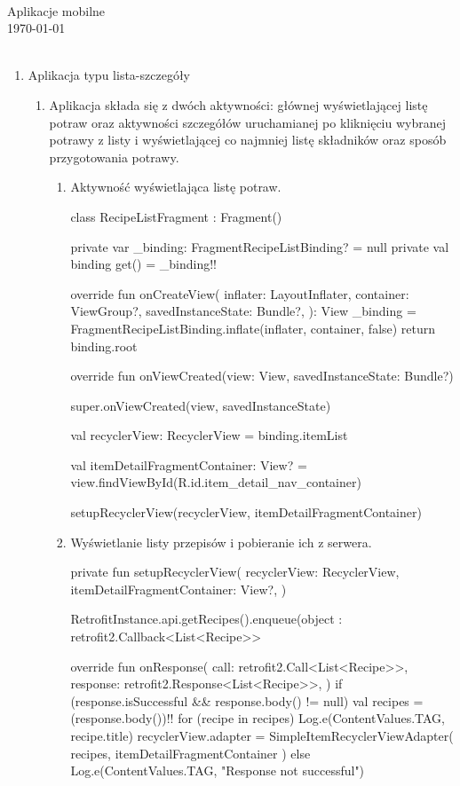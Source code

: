 \documentclass{article}
\begin{document}
\begin{center}\vspace{-1cm}
    \textbf{ \Huge }\\
    \LARGE Aplikacje mobilne\\
    \large \today \\~\\
\end{center}

\begin{enumerate}
\item Aplikacja typu lista-szczegóły
\begin{enumerate}
\item Aplikacja składa się z dwóch aktywności: głównej wyświetlającej listę potraw oraz aktywności szczegółów uruchamianej po kliknięciu wybranej potrawy z listy i wyświetlającej co najmniej listę składników oraz sposób przygotowania potrawy.

\begin{enumerate}

\item Aktywność wyświetlająca listę potraw.
\begin{mylisting}
class RecipeListFragment : Fragment() {
    private var _binding: FragmentRecipeListBinding? = null
    private val binding get() = _binding!!

    override fun onCreateView(
        inflater: LayoutInflater, container: ViewGroup?,
        savedInstanceState: Bundle?,
    ): View {
        _binding = FragmentRecipeListBinding.inflate(inflater, container, false)
        return binding.root
    }

    override fun onViewCreated(view: View, savedInstanceState: Bundle?) {
        super.onViewCreated(view, savedInstanceState)

        val recyclerView: RecyclerView = binding.itemList

        val itemDetailFragmentContainer: View? = 
        view.findViewById(R.id.item_detail_nav_container)

        setupRecyclerView(recyclerView, itemDetailFragmentContainer)
    }
}
\end{mylisting}

\newpage
\item Wyświetlanie listy przepisów i pobieranie ich z serwera.
\begin{mylisting}
private fun setupRecyclerView(
    recyclerView: RecyclerView,
    itemDetailFragmentContainer: View?,
) {
    RetrofitInstance.api.getRecipes().enqueue(object : retrofit2.Callback<List<Recipe>> {
        override fun onResponse(
            call: retrofit2.Call<List<Recipe>>,
            response: retrofit2.Response<List<Recipe>>,
        ) {
            if (response.isSuccessful && response.body() != null) {
                val recipes = (response.body())!!
                for (recipe in recipes) {
                    Log.e(ContentValues.TAG, recipe.title)
                }
                recyclerView.adapter = SimpleItemRecyclerViewAdapter(
                    recipes, itemDetailFragmentContainer
                )
            } else {
                Log.e(ContentValues.TAG, "Response not successful")
            }
        }

}}
\end{mylisting}
\end{enumerate}
\end{enumerate}
\end{enumerate}
\end{document}
